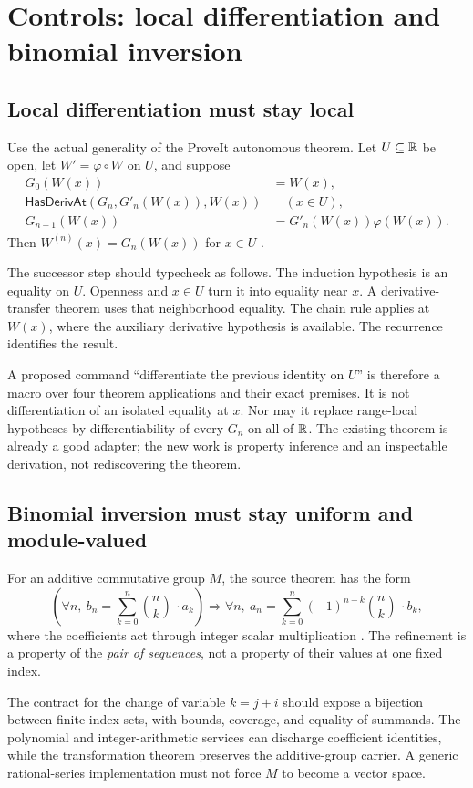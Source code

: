 \documentclass[11pt,letterpaper]{article}
\theoremstyle{definition}\newtheorem{definition}[theorem]{Definition}
\begin{document}
\section{Controls: local differentiation and binomial inversion}\label{sec:controls}
\subsection{Local differentiation must stay local}
Use the actual generality of the ProveIt autonomous theorem. Let $U\subseteq\mathbb R$ be open, let $W'=\varphi\circ W$ on $U$, and suppose
\begin{align*}
 G_0(W(x))&=W(x),\\
 \mathsf{HasDerivAt}(G_n,G'_n(W(x)),W(x))&\quad(x\in U),\\
 G_{n+1}(W(x))&=G'_n(W(x))\varphi(W(x)).
\end{align*}
Then $W^{(n)}(x)=G_n(W(x))$ for $x\in U$ \cite{autonomous}.

The successor step should typecheck as follows. The induction hypothesis is an equality on $U$. Openness and $x\in U$ turn it into equality near $x$. A derivative-transfer theorem uses that neighborhood equality. The chain rule applies at $W(x)$, where the auxiliary derivative hypothesis is available. The recurrence identifies the result.

A proposed command ``differentiate the previous identity on $U$'' is therefore a macro over four theorem applications and their exact premises. It is not differentiation of an isolated equality at $x$. Nor may it replace range-local hypotheses by differentiability of every $G_n$ on all of $\mathbb R$. The existing theorem is already a good adapter; the new work is property inference and an inspectable derivation, not rediscovering the theorem.

\subsection{Binomial inversion must stay uniform and module-valued}
For an additive commutative group $M$, the source theorem has the form
\[
 \left(\forall n,\ b_n=\sum_{k=0}^n\binom nk\,\mathbin{\cdot}a_k\right)
 \Longrightarrow
 \forall n,\ a_n=\sum_{k=0}^n(-1)^{n-k}\binom nk\,\mathbin{\cdot}b_k,
\]
where the coefficients act through integer scalar multiplication \cite{binomial}. The refinement is a property of the \emph{pair of sequences}, not a property of their values at one fixed index.

The contract for the change of variable $k=j+i$ should expose a bijection between finite index sets, with bounds, coverage, and equality of summands. The polynomial and integer-arithmetic services can discharge coefficient identities, while the transformation theorem preserves the additive-group carrier. A generic rational-series implementation must not force $M$ to become a vector space.
\end{document}
